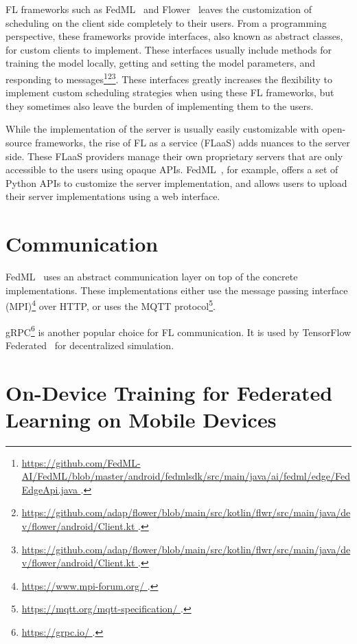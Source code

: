 \documentclass[conference]{IEEEtran}
\begin{document}
FL frameworks such as FedML~\cite{he2020fedml} and
Flower~\cite{beutel2020flower} leaves the customization of
scheduling on the client side completely to their users.
From a programming perspective,
these frameworks provide interfaces,
also known as abstract classes,
for custom clients to implement.
These interfaces usually include methods for
training the model locally,
getting and setting the model parameters,
and responding to messages\footnote{\url{
    https://github.com/FedML-AI/FedML/blob/master/android/fedmlsdk/src/main/java/ai/fedml/edge/FedEdgeApi.java
}.}\footnote{\url{
    https://github.com/adap/flower/blob/main/src/kotlin/flwr/src/main/java/dev/flower/android/Client.kt
}.}\footnote{\url{
    https://github.com/adap/flower/blob/main/src/kotlin/flwr/src/main/java/dev/flower/android/Client.kt
}.}.
These interfaces greatly increases the flexibility to
implement custom scheduling strategies when using these FL frameworks,
but they sometimes also leave the burden of implementing them to the users.

While the implementation of the server is usually easily customizable with
open-source frameworks,
the rise of FL as a service (FLaaS)
adds nuances to the server side.
These FLaaS providers manage their own proprietary servers that
are only accessible to the users using opaque APIs.
FedML~\cite{he2020fedml}, for example,
offers a set of Python APIs to customize the server implementation,
and allows users to upload their server implementations using a web interface.

\section{Communication}

FedML~\cite{he2020fedml} uses an abstract communication layer on top of
the concrete implementations.
These implementations either use the message passing interface
(MPI)\footnote{\url{
    https://www.mpi-forum.org/
}.} over HTTP,
or uses the MQTT protocol\footnote{\url{
    https://mqtt.org/mqtt-specification/
}.}.

gRPC\footnote{\url{
    https://grpc.io/
}.} is another popular choice for FL communication.
It is used by TensorFlow Federated~\cite{tff} for decentralized simulation.

\section{On-Device Training for Federated Learning on Mobile Devices}
\end{document}
